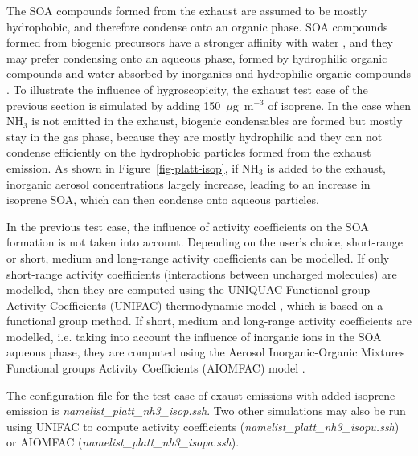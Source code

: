 \documentclass[a4paper,11pt]{article}
\begin{document}
{{The SOA compounds formed from the exhaust are assumed to be mostly hydrophobic, and
therefore condense onto an organic phase. SOA compounds formed from biogenic precursors have a stronger affinity with water \cite{couvidat11, couvidat2012}, and they may prefer condensing onto an aqueous phase, formed by hydrophilic organic compounds and water absorbed by inorganics and hydrophilic organic compounds \cite{kim2019}.
To illustrate the influence of hygroscopicity, the exhaust test case of the previous section is simulated by adding 150~$\mu$g~m$^{-3}$ of isoprene. In the case when NH$_3$ is not emitted in the exhaust, biogenic condensables are formed but mostly stay in the gas phase, because they are mostly hydrophilic and 
they can not condense efficiently on the hydrophobic particles formed from the exhaust emission.
As shown in Figure~\ref{fig-platt-isop}, if NH$_3$ is added to the exhaust, inorganic aerosol concentrations largely increase, leading to an increase in isoprene SOA, which can then condense onto aqueous particles.

In the previous test case, the influence of activity coefficients on the SOA formation is not taken into account. 
Depending on the user's choice, short-range or short, medium and long-range activity coefficients can be modelled. If only short-range activity coefficients (interactions between uncharged molecules) are modelled, then they are computed using the UNIQUAC Functional-group Activity Coefficients (UNIFAC) thermodynamic model \cite{Fredenslund}, 
which is based on a functional group method. If short, medium and long-range activity coefficients are modelled, i.e. taking into account the influence of inorganic ions in the SOA aqueous phase, they are computed using the Aerosol Inorganic-Organic Mixtures Functional groups Activity Coefficients (AIOMFAC) model \cite{zuend2008}. 

The configuration file for the test case of exaust emissions with added isoprene emission is {\it{namelist\_platt\_nh3\_isop.ssh}}.
Two other simulations may also be run using UNIFAC to compute activity coefficients ({\it{namelist\_platt\_nh3\_isopu.ssh}}) or AIOMFAC ({\it{namelist\_platt\_nh3\_isopa.ssh}}).

}}
\end{document}
